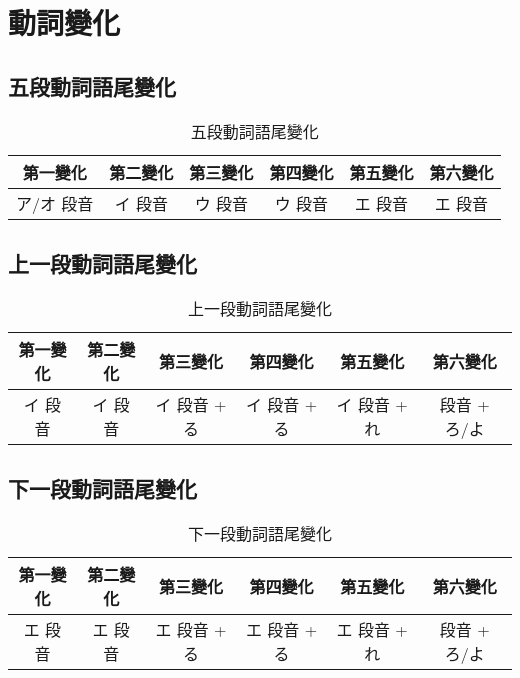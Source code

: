 \documentclass[12pt]{article}
\begin{document}
\begin{CJK}{UTF8}{nsung}
\begin{table}[htdp]
\begin{tabular}{cccccccccc}
\hline
\end{tabular}
\end{table}

\section{動詞變化}

\subsection{五段動詞語尾變化}
\begin{table}[htdp]
\begin{tabular}{cccccc}
\hline
第一變化 & 第二變化 & 第三變化 & 第四變化 & 第五變化 & 第六變化 \\
\hline
ア/オ 段音 & イ 段音 & ウ 段音 & ウ 段音  & エ 段音 & エ 段音  \\
\hline
\end{tabular}
\caption{五段動詞語尾變化}
\end{table}

\subsection{上一段動詞語尾變化}
\begin{table}[htdp]
\begin{tabular}{cccccc}
\hline
第一變化 & 第二變化 & 第三變化 & 第四變化 & 第五變化 & 第六變化 \\
\hline
イ 段音 & イ 段音 & イ 段音 + る &  イ 段音 + る &  イ 段音 + れ &  段音 + ろ/よ \\
\hline
\end{tabular}
\caption{上一段動詞語尾變化}
\end{table}

\subsection{下一段動詞語尾變化}
\begin{table}[htdp]
\begin{tabular}{cccccc}
\hline
第一變化 & 第二變化 & 第三變化 & 第四變化 & 第五變化 & 第六變化 \\
\hline
エ 段音 & エ 段音 & エ 段音 + る &  エ 段音 + る &  エ 段音 + れ &  段音 + ろ/よ \\
\hline
\end{tabular}
\caption{下一段動詞語尾變化}
\end{table}


\end{CJK}
\end{document}
